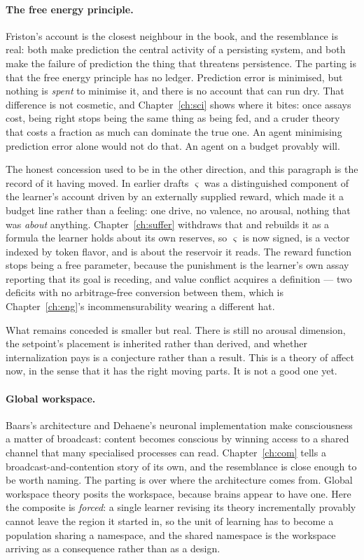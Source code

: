 \paragraph{The free energy principle.}
Friston's account \cite{friston2010free} is the closest neighbour
in the book, and the resemblance is real: both make prediction the
central activity of a persisting system, and both make the failure
of prediction the thing that threatens persistence.
The parting is that the free energy principle has no ledger.
Prediction error is minimised, but nothing is \emph{spent} to
minimise it, and there is no account that can run dry.
That difference is not cosmetic, and Chapter~\ref{ch:sci} shows
where it bites: once assays cost, being right stops being the same
thing as being fed, and a cruder theory that costs a fraction as
much can dominate the true one.
An agent minimising prediction error alone would not do that.
An agent on a budget provably will.

The honest concession used to be in the other direction, and this
paragraph is the record of it having moved.
In earlier drafts $\varsigma$ was a distinguished component of the
learner's account driven by an externally supplied reward, which made it
a budget line rather than a feeling: one drive, no valence, no arousal,
nothing that was \emph{about} anything.
Chapter~\ref{ch:suffer} withdraws that and rebuilds it as a formula the
learner holds about its own reserves, so $\varsigma$ is now signed, is a
vector indexed by token flavor, and is about the reservoir it reads.
The reward function stops being a free parameter, because the punishment
is the learner's own assay reporting that its goal is receding, and value
conflict acquires a definition --- two deficits with no arbitrage-free
conversion between them, which is Chapter~\ref{ch:eng}'s
incommensurability wearing a different hat.

What remains conceded is smaller but real.
There is still no arousal dimension, the setpoint's placement is
inherited rather than derived, and whether internalization pays is a
conjecture rather than a result.
This is a theory of affect now, in the sense that it has the right
moving parts.  It is not a good one yet.

\paragraph{Global workspace.}
Baars's architecture \cite{baars1988} and Dehaene's neuronal
implementation \cite{dehaene2011} make consciousness a matter of
broadcast: content becomes conscious by winning access to a shared
channel that many specialised processes can read.
Chapter~\ref{ch:com} tells a broadcast-and-contention story of its
own, and the resemblance is close enough to be worth naming.
The parting is over where the architecture comes from.
Global workspace theory posits the workspace, because brains appear
to have one.
Here the composite is \emph{forced}: a single learner revising its
theory incrementally provably cannot leave the region it started
in, so the unit of learning has to become a population sharing a
namespace, and the shared namespace is the workspace arriving as a
consequence rather than as a design.

